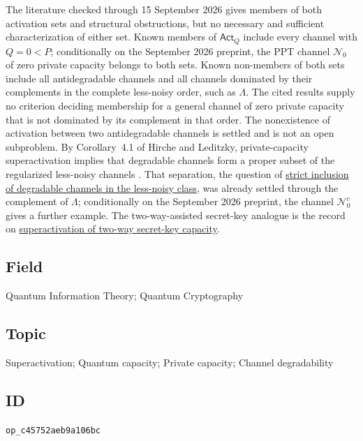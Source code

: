 The literature checked through 15 September 2026 gives members of both activation sets and structural obstructions, but no necessary and sufficient characterization of either set. Known members of $\mathsf{Act}_Q$ include every channel with $Q=0<P$; conditionally on the September 2026 preprint, the PPT channel $\mathcal N_0$ of zero private capacity belongs to both sets. Known non-members of both sets include all antidegradable channels and all channels dominated by their complements in the complete less-noisy order, such as $\Lambda$. The cited results supply no criterion deciding membership for a general channel of zero private capacity that is not dominated by its complement in that order. The nonexistence of activation between two antidegradable channels is settled and is not an open subproblem.
By Corollary~4.1 of Hirche and Leditzky, private-capacity superactivation implies that degradable channels form a proper subset of the regularized less-noisy channels . That separation, the question of \href{https://qiqc-op.com/problem/op_fd75613c5bab4164/}{strict inclusion of degradable channels in the less-noisy class}, was already settled through the complement of $\Lambda$; conditionally on the September 2026 preprint, the channel $\mathcal N_0^c$ gives a further example.
The two-way-assisted secret-key analogue is the record on
\href{https://qiqc-op.com/problem/op_59e9ede6e282a917/}{superactivation of two-way secret-key capacity}.

\subsection*{Field}

Quantum Information Theory; Quantum Cryptography

\subsection*{Topic}

Superactivation; Quantum capacity; Private capacity; Channel degradability

\subsection*{ID}

\texttt{op\_c45752aeb9a106bc}
